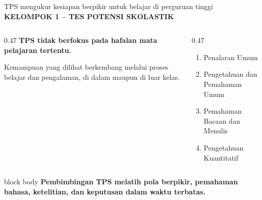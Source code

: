 \documentclass[aspectratio=169,11pt]{beamer}
\newcommand{\kicker}[1]{%
  {\color{StudentCyan}\bfseries\fontsize{10.5}{13}\selectfont\MakeUppercase{#1}}\par\vspace{0.11cm}
}
\newcommand{\claim}[1]{%
  {\color{StudentNavy}\bfseries\fontsize{18}{22}\selectfont #1}\par
}
\begin{document}
\begin{frame}{TPS mengukur kesiapan berpikir untuk belajar di perguruan tinggi}
  \kicker{Kelompok 1 -- Tes Potensi Skolastik}
  \begin{columns}[T,onlytextwidth]
    \begin{column}{0.47\textwidth}
      \claim{TPS tidak berfokus pada hafalan mata pelajaran tertentu.}
      \vspace{0.22cm}
      {\fontsize{12}{15}\selectfont Kemampuan yang dilihat berkembang melalui proses belajar dan pengalaman, di dalam maupun di luar kelas.}
    \end{column}
    \begin{column}{0.47\textwidth}
      \begin{enumerate}
        \item Penalaran Umum
        \item Pengetahuan dan Pemahaman Umum
        \item Pemahaman Bacaan dan Menulis
        \item Pengetahuan Kuantitatif
      \end{enumerate}
    \end{column}
  \end{columns}
  \vspace{0.18cm}
  \begin{beamercolorbox}[rounded=true,sep=0.17cm,wd=\textwidth]{block body}
    \centering\bfseries Pembimbingan TPS melatih pola berpikir, pemahaman bahasa, ketelitian, dan keputusan dalam waktu terbatas.
  \end{beamercolorbox}
\end{frame}
\end{document}

